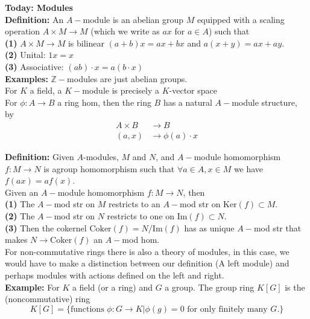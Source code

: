 \documentclass{article}
\newcommand{\Z}{\mathbb{Z}}
\begin{document}
\textbf{Today: Modules} \\

\textbf{Definition:} An $A-$module is an abelian group $M$ equipped with a scaling operation $A \times M \to M$ (which we write as $ax$ for $a \in A$) such that \\
\indent \textbf{(1)} $A \times M \to M$ is bilinear $(a+b)x = ax + bx$ and $a(x + y) = ax + ay$. \\
\indent \textbf{(2)} Unital: $1x = x$\\
\indent \textbf{(3)} Associative: $(ab)\cdot x = a(b\cdot x)$\\

\textbf{Examples: } $\Z-$modules are just abelian groups.\\

For $K$ a field, a $K-$module is precisely a $K$-vector space\\

For $\phi: A \to B$ a ring hom, then the ring $B$ has a natural $A-$module structure, by 
\begin{align*}
	A \times B &\to B\\
	(a,x) &\to \phi(a)\cdot x
\end{align*}

\textbf{Definition:} Given $A$-modules, $M$ and $N$, and $A-$module homomorphism $f: M \to N$ is agroup homomorphism such that $\forall a \in A, x \in M$ we have $f(ax) = af(x)$.\\

Given an $A-$module homomorphism $f: M \to N$, then \\
\indent \textbf{(1)} The $A-$mod str on $M$ restricts to an $A-$mod str on $\text{Ker}(f) \subset M$.\\
\indent \textbf{(2)} The $A-$mod str on $N$ restricts to one on $\text{Im}(f) \subset N$.\\
\indent \textbf{(3)} Then the cokernel $\text{Coker}(f)  = N/\text{Im}(f)$ has as unique $A-$mod str that makes $N \to \text{Coker}(f)$ an $A-$mod hom.\\

For non-commutative rings there is also a theory of modules, in this case, we would have to make a distinction between our definition (A left module) and perhaps modules with actions defined on the left and right.\\

\textbf{Example: } For $K$ a field (or a ring) and $G$ a group. The group ring $K[G]$ is the (noncommutative) ring 
\[K[G] = \{\text{functions $\phi: G \to K$
} | \text{$\phi(g) = 0$ for only finitely many $G$.}\}\]
\end{document}
